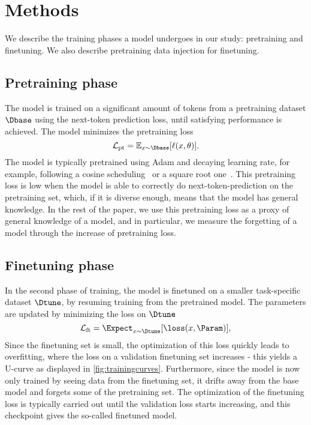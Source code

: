 \section{Methods}
\label{sec:methods}

We describe the training phases a model undergoes in our study: pretraining and finetuning.
We also describe pretraining data injection for finetuning.

\subsection{Pretraining phase}

The model is trained on a significant amount of tokens from a pretraining dataset $\Dbase$ using the next-token prediction loss, until satisfying performance is achieved. 
The model minimizes the pretraining loss
\begin{equation}
\mathcal{L}_{\mathrm{pt}} = \mathbb{E}_{x\sim \Dbase}[\ell(x, \theta)].
    \label{eq:loss_pt}
\end{equation}
The model is typically pretrained using Adam and decaying learning rate, for example, following a cosine scheduling~\citep{loshchilov2017sgdr} or a square root one~\citep{hagele2024scaling}. 
This pretraining loss is low when the model is able to correctly do next-token-prediction on the pretraining set, which, if it is diverse enough, means that the model has general knowledge. 
In the rest of the paper, we use this pretraining loss as a proxy of general knowledge of a model, and in particular, we measure the forgetting of a model through the increase of pretraining loss.


\subsection{Finetuning phase}

In the second phase of training, the model is finetuned on a smaller task-specific dataset $\Dtune$, by resuming training from the pretrained model. The parameters are updated by minimizing the loss on $\Dtune$
\begin{equation}\label{eq:secondphase}
\mathcal{L}_{\mathrm{ft}} = \Expect_{x\sim\Dtune}[\loss(x,\Param)],
\end{equation}
Since the finetuning set is small, the optimization of this loss quickly leads to overfitting, where the loss on a validation finetuning set increases - this yields a U-curve as displayed in \autoref{fig:trainingcurves}. Furthermore, since the model is now only trained by seeing data from the finetuning set, it drifts away from the base model and forgets some of the pretraining set.
The optimization of the finetuning loss is typically carried out until the validation loss starts increasing, and this checkpoint gives the so-called finetuned model.

